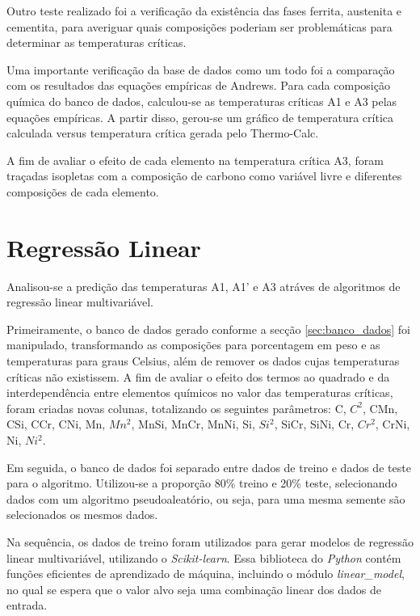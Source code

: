 \documentclass[brazil,tf,epusp]{usp}  %
\begin{document}
Outro teste realizado foi a verificação da existência das fases ferrita, austenita e cementita, para averiguar quais composições poderiam ser problemáticas para determinar as temperaturas críticas.

Uma importante verificação da base de dados como um todo foi a comparação com os resultados das equações empíricas de Andrews. Para cada composição química do banco de dados, calculou-se as temperaturas críticas A1 e A3 pelas equações empíricas. A partir disso, gerou-se um gráfico de temperatura crítica calculada versus temperatura crítica gerada pelo Thermo-Calc\textregistered{}.

A fim de avaliar o efeito de cada elemento na temperatura crítica A3, foram traçadas isopletas com a composição de carbono como variável livre e diferentes composições de cada elemento.

\section{Regressão Linear}
\label{sec:metodo_RL}

Analisou-se a predição das temperaturas A1, A1' e A3 atráves de algoritmos de regressão linear multivariável.

Primeiramente, o banco de dados gerado conforme a secção \ref{sec:banco_dados} foi manipulado, transformando as composições para porcentagem em peso e as temperaturas para graus Celsius, além de remover os dados cujas temperaturas críticas não existissem. A fim de avaliar o efeito dos termos ao quadrado e da interdependência entre elementos químicos no valor das temperaturas críticas, foram criadas novas colunas, totalizando os seguintes parâmetros: C, $C^{2}$, CMn, CSi, CCr, CNi, Mn, $Mn^{2}$, MnSi, MnCr, MnNi, Si, $Si^{2}$, SiCr, SiNi, Cr, $Cr^{2}$, CrNi, Ni, $Ni^{2}$.

Em seguida, o banco de dados foi separado entre dados de treino e dados de teste para o algoritmo. Utilizou-se a proporção 80\% treino e 20\% teste, selecionando dados com um algoritmo pseudoaleatório, ou seja, para uma mesma semente são selecionados os mesmos dados.

Na sequência, os dados de treino foram utilizados para gerar modelos de regressão linear multivariável, utilizando o \textit{Scikit-learn}. Essa biblioteca do \textit{Python} contém funções eficientes de aprendizado de máquina, incluindo o módulo \textit{linear\_model}, no qual se espera que o valor alvo seja uma combinação linear dos dados de entrada.
\end{document}
